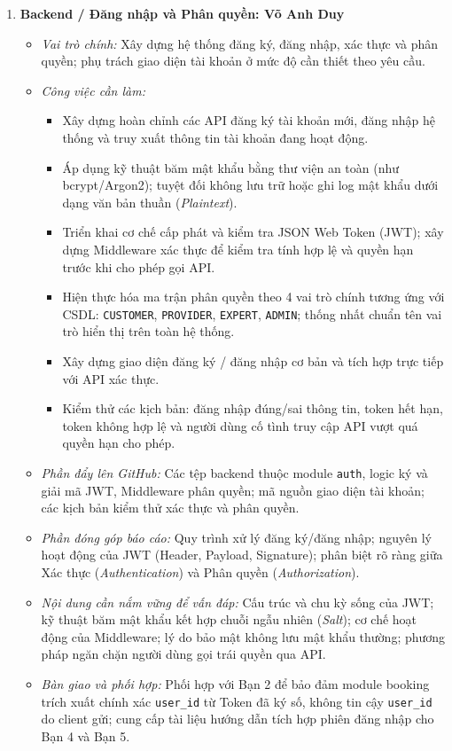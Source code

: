 \begin{enumerate}[leftmargin=1.5em]
    \item \textbf{Backend / Đăng nhập và Phân quyền: Võ Anh Duy}
    \begin{itemize}[leftmargin=1.2em]
        \item \textit{Vai trò chính:} Xây dựng hệ thống đăng ký, đăng nhập, xác thực và phân quyền; phụ trách giao diện tài khoản ở mức độ cần thiết theo yêu cầu.
        \item \textit{Công việc cần làm:}
        \begin{itemize}[label={--}]
            \item Xây dựng hoàn chỉnh các API đăng ký tài khoản mới, đăng nhập hệ thống và truy xuất thông tin tài khoản đang hoạt động.
            \item Áp dụng kỹ thuật băm mật khẩu bằng thư viện an toàn (như bcrypt/Argon2); tuyệt đối không lưu trữ hoặc ghi log mật khẩu dưới dạng văn bản thuần (\textit{Plaintext}).
            \item Triển khai cơ chế cấp phát và kiểm tra JSON Web Token (JWT); xây dựng Middleware xác thực để kiểm tra tính hợp lệ và quyền hạn trước khi cho phép gọi API.
            \item Hiện thực hóa ma trận phân quyền theo 4 vai trò chính tương ứng với CSDL: \texttt{CUSTOMER}, \texttt{PROVIDER}, \texttt{EXPERT}, \texttt{ADMIN}; thống nhất chuẩn tên vai trò hiển thị trên toàn hệ thống.
            \item Xây dựng giao diện đăng ký / đăng nhập cơ bản và tích hợp trực tiếp với API xác thực.
            \item Kiểm thử các kịch bản: đăng nhập đúng/sai thông tin, token hết hạn, token không hợp lệ và người dùng cố tình truy cập API vượt quá quyền hạn cho phép.
        \end{itemize}
        \item \textit{Phần đẩy lên GitHub:} Các tệp backend thuộc module \texttt{auth}, logic ký và giải mã JWT, Middleware phân quyền; mã nguồn giao diện tài khoản; các kịch bản kiểm thử xác thực và phân quyền.
        \item \textit{Phần đóng góp báo cáo:} Quy trình xử lý đăng ký/đăng nhập; nguyên lý hoạt động của JWT (Header, Payload, Signature); phân biệt rõ ràng giữa Xác thực (\textit{Authentication}) và Phân quyền (\textit{Authorization}).
        \item \textit{Nội dung cần nắm vững để vấn đáp:} Cấu trúc và chu kỳ sống của JWT; kỹ thuật băm mật khẩu kết hợp chuỗi ngẫu nhiên (\textit{Salt}); cơ chế hoạt động của Middleware; lý do bảo mật không lưu mật khẩu thường; phương pháp ngăn chặn người dùng gọi trái quyền qua API.
        \item \textit{Bàn giao và phối hợp:} Phối hợp với Bạn 2 để bảo đảm module booking trích xuất chính xác \texttt{user\_id} từ Token đã ký số, không tin cậy \texttt{user\_id} do client gửi; cung cấp tài liệu hướng dẫn tích hợp phiên đăng nhập cho Bạn 4 và Bạn 5.
    \end{itemize}


\end{enumerate}
